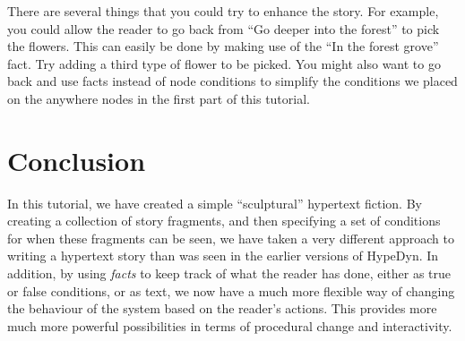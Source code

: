 \documentclass{article}
\begin{document}
There are several things that you could try to enhance the story. For example,
you could allow the reader to go back from ``Go deeper into the forest'' to pick
the flowers. This can easily be done by making use of the ``In the forest grove''
fact. Try adding a third type of flower to be picked. You might also want to go
back and use facts instead of node conditions to simplify the conditions we
placed on the anywhere nodes in the first part of this tutorial.

\section{Conclusion}

In this tutorial, we have created a simple ``sculptural'' hypertext fiction. By
creating a collection of story fragments, and then specifying a set of
conditions for when these fragments can be seen, we have taken a very different
approach to writing a hypertext story than was seen in the earlier versions of
HypeDyn. In addition, by using \textit{facts} to keep track of what the reader
has done, either as true or false conditions, or as text, we now have a much
more flexible way of changing the behaviour of the system based on the reader's
actions. This provides more much more powerful possibilities in terms of
procedural change and interactivity.

% 

  
  
\end{document}
